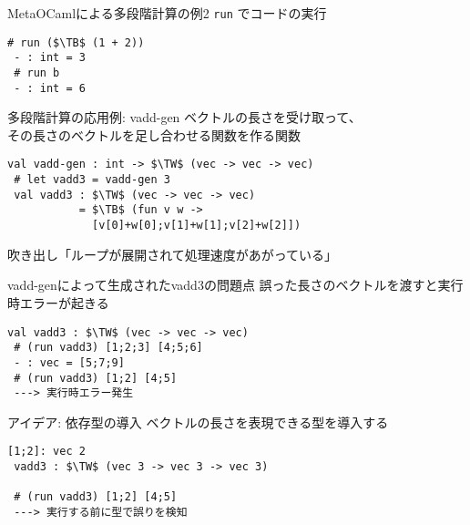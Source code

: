 \documentclass[dvipdfmx,aspectratio=169, 20pt]{beamer}
\renewcommand{\V}{\vdash}
\begin{document}
\begin{frame}[fragile]{MetaOCamlによる多段階計算の例2}
    \verb|run| でコードの実行
    \begin{exampleblock}{}
        \begin{Verbatim}[commandchars=\\\{\},codes={\catcode`$=3\catcode`^=7}]
 # run ($\TB$ (1 + 2))
 - : int = 3
 # run b
 - : int = 6
        \end{Verbatim}
    \end{exampleblock}
\end{frame}

\begin{frame}[fragile]{多段階計算の応用例: vadd-gen}
    ベクトルの長さを受け取って、\\その長さのベクトルを足し合わせる関数を作る関数
    \begin{exampleblock}{}
        \begin{Verbatim}[commandchars=\\\{\},codes={\catcode`$=3\catcode`^=7}]
 val vadd-gen : int -> $\TW$ (vec -> vec -> vec)
 # let vadd3 = vadd-gen 3
 val vadd3 : $\TW$ (vec -> vec -> vec)
           = $\TB$ (fun v w ->
             [v[0]+w[0];v[1]+w[1];v[2]+w[2]])
    \end{Verbatim}
    \end{exampleblock}
    吹き出し「ループが展開されて処理速度があがっている」
\end{frame}

\begin{frame}[fragile]{vadd-genによって生成されたvadd3の問題点}
    誤った長さのベクトルを渡すと実行時エラーが起きる
    \begin{exampleblock}{}
        \begin{Verbatim}[commandchars=\\\{\},codes={\catcode`$=3\catcode`^=7}]
 val vadd3 : $\TW$ (vec -> vec -> vec)
 # (run vadd3) [1;2;3] [4;5;6]
 - : vec = [5;7;9]
 # (run vadd3) [1;2] [4;5]
 ---> 実行時エラー発生
    \end{Verbatim}
    \end{exampleblock}
\end{frame}

\begin{frame}[fragile]{アイデア: 依存型の導入}
    \renewcommand{\V}{\text{vec}\ }
    ベクトルの長さを表現できる型を導入する
    \begin{exampleblock}{}
        \begin{Verbatim}[commandchars=\\\{\},codes={\catcode`$=3\catcode`^=7}]
 [1;2]: vec 2
 vadd3 : $\TW$ (vec 3 -> vec 3 -> vec 3)

 # (run vadd3) [1;2] [4;5]
 ---> 実行する前に型で誤りを検知
 \end{Verbatim}
    \end{exampleblock}
\end{frame}
\end{document}
